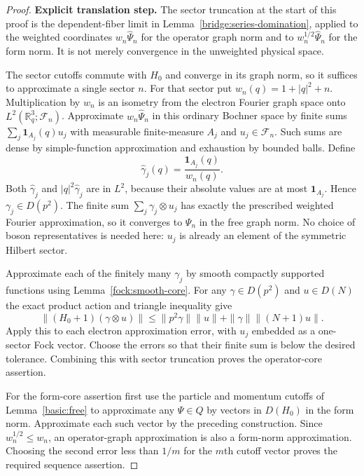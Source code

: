 \documentclass[11pt,a4paper]{article}
\theoremstyle{definition}
\theoremstyle{remark}
\begin{document}
\begin{proof}
\noindent\textbf{Explicit translation step.} The sector truncation at the start of this proof is the dependent-fiber
limit in Lemma~\ref{bridge:series-domination}, applied to the weighted
coordinates $w_n\widehat\Psi_n$ for the operator graph norm and to
$w_n^{1/2}\widehat\Psi_n$ for the form norm. It is not merely convergence
in the unweighted physical space.

The sector cutoffs commute with $H_0$ and converge in its graph
norm, so it suffices to approximate a single sector $n$.
For that sector put $w_n(q)=1+|q|^2+n$. Multiplication by $w_n$
is an isometry from the electron Fourier graph space onto
$L^2(\mathbb R^3_q;\mathcal F_n)$. Approximate
$w_n\widehat\Psi_n$ in this ordinary Bochner space by finite sums
$\sum_j\mathbf1_{A_j}(q)u_j$ with measurable finite-measure $A_j$
and $u_j\in\mathcal F_n$. Such sums are dense by simple-function
approximation and exhaustion by bounded balls. Define
\[
 \widehat\gamma_j(q)=\frac{\mathbf1_{A_j}(q)}{w_n(q)}.
\]
Both $\widehat\gamma_j$ and $|q|^2\widehat\gamma_j$ are in $L^2$,
because their absolute values are at most $\mathbf1_{A_j}$.
Hence $\gamma_j\in D(p^2)$. The finite sum
$\sum_j\gamma_j\otimes u_j$ has exactly the prescribed weighted
Fourier approximation, so it converges to $\Psi_n$ in the free
graph norm. No choice of boson representatives is needed here:
$u_j$ is already an element of the symmetric Hilbert sector.

Approximate each of the finitely many $\gamma_j$ by smooth compactly
supported functions using Lemma~\ref{fock:smooth-core}. For any
$\gamma\in D(p^2)$ and $u\in D(N)$ the exact product action and
triangle inequality give
\begin{equation}\label{fock:eq-product-graph}
 \|(H_0+1)(\gamma\otimes u)\|
 \leq\|p^2\gamma\|\|u\|+\|\gamma\|\|(N+1)u\|.
\end{equation}
Apply this to each electron approximation error, with $u_j$
embedded as a one-sector Fock vector. Choose the errors so that
their finite sum is below the desired tolerance. Combining this
with sector truncation proves the operator-core assertion.

For the form-core assertion first use the particle and momentum
cutoffs of Lemma~\ref{basic:free} to approximate any $\Psi\in Q$
by vectors in $D(H_0)$ in the form norm. Approximate each such vector
by the preceding construction. Since $w_n^{1/2}\leq w_n$,
an operator-graph approximation is also a form-norm approximation.
Choosing the second error less than $1/m$ for the $m$th cutoff
vector proves the required sequence assertion.
\end{proof}
\end{document}
